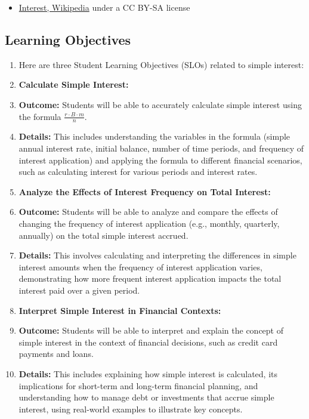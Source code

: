 \begin{itemize}
    \item \href{https://en.wikipedia.org/wiki/Interest}{Interest, Wikipedia} under a CC BY-SA license
\end{itemize}


\subsection{Learning Objectives}
\label{ssec:lear-fe6e}


\begin{enumerate}
    \item Here are three Student Learning Objectives (SLOs) related to simple interest:
    \item \textbf{Calculate Simple Interest:}
    \item \textbf{Outcome:} Students will be able to accurately calculate simple interest using the formula $\frac{r \cdot B \cdot m}{n}$.
    \item \textbf{Details:} This includes understanding the variables in the formula (simple annual interest rate, initial balance, number of time periods, and frequency of interest application) and applying the formula to different financial scenarios, such as calculating interest for various periods and interest rates.
    \item \textbf{Analyze the Effects of Interest Frequency on Total Interest:}
    \item \textbf{Outcome:} Students will be able to analyze and compare the effects of changing the frequency of interest application (e.g., monthly, quarterly, annually) on the total simple interest accrued.
    \item \textbf{Details:} This involves calculating and interpreting the differences in simple interest amounts when the frequency of interest application varies, demonstrating how more frequent interest application impacts the total interest paid over a given period.
    \item \textbf{Interpret Simple Interest in Financial Contexts:}
    \item \textbf{Outcome:} Students will be able to interpret and explain the concept of simple interest in the context of financial decisions, such as credit card payments and loans.
    \item \textbf{Details:} This includes explaining how simple interest is calculated, its implications for short-term and long-term financial planning, and understanding how to manage debt or investments that accrue simple interest, using real-world examples to illustrate key concepts.
\end{enumerate}


